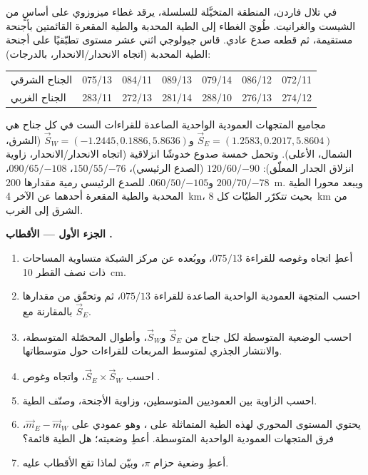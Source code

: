 \begin{problem}
\label{pb:b3:structural-analysis:1}
في تلال فاردن، المنطقة المتخيَّلة للسلسلة، يرقد غطاء ميزوزوي على
أساسٍ من الشيست والغرانيت. طُويَ الغطاء إلى الطية المحدبة والطية المقعرة
القائمتين بأجنحة مستقيمة، ثم قطعه صدع عادي. قاس جيولوجي
اثني عشر مستوى تطبّقيًا على أجنحة الطية المحدبة
(اتجاه الانحدار/الانحدار، بالدرجات):

\begin{center}
\small
\begin{tabular}{l|cccccc}
\hline
الجناح الشرقي & 075/13 & 084/11 & 089/13 & 079/14 & 086/12 & 072/11 \\
الجناح الغربي & 283/11 & 272/13 & 281/14 & 288/10 & 276/13 & 274/12 \\
\hline
\end{tabular}
\end{center}

مجاميع المتجهات العمودية الواحدية الصاعدة للقراءات الست في كل جناح هي
$\vec S_E = (1.2583, 0.2017, 5.8604)$ و$\vec S_W = (-1.2445, 0.1886,
5.8636)$ (الشرق، الشمال، الأعلى). وتحمل خمسة صدوع خدوشًا انزلاقية (اتجاه الانحدار/الانحدار،
زاوية انزلاق الجدار المعلّق): $120/60/{-90}$ (الصدع الرئيسي)، $150/55/{-76}$،
$090/65/{-108}$، $200/70/{-78}$ و$060/50/{-105}$. للصدع الرئيسي
رمية مقدارها \qty{200}{m}. ويبعد محورا الطية المحدبة والطية المقعرة أحدهما عن الآخر \qty{4}{km}،
بحيث تتكرّر الطيّات كل \qty{8}{km} من الشرق إلى الغرب.

\medskip\noindent\textbf{الجزء الأول --- الأقطاب .}
\begin{enumerate}
  \item أعطِ اتجاه  وغوصه للقراءة $075/13$،
        ووبُعده عن مركز الشبكة متساوية المساحات ذات نصف القطر
        \qty{10}{cm}.
  \item احسب المتجهة العمودية الواحدية الصاعدة للقراءة $075/13$، ثم
        وتحقّق من مقدارها بالمقارنة مع $\vec S_E$.
  \item احسب الوضعية المتوسطة لكل جناح من $\vec S_E$ و$\vec S_W$،
        وأطوال المحصّلة المتوسطة، والانتشار الجذري لمتوسط المربعات للقراءات
        حول متوسطاتها.
  \item احسب $\vec S_E\times\vec S_W$، واتجاه
        وغوص .
  \item احسب الزاوية بين العموديين المتوسطين، وزاوية الأجنحة،
        وصنّف الطية.
  \item يحتوي المستوى المحوري لهذه الطية المتماثلة على ، وهو
        عمودي على $\vec m_E - \vec m_W$، فرق المتجهات
        العمودية الواحدية المتوسطة. أعطِ وضعيته؛ هل الطية قائمة؟
  \item أعطِ وضعية حزام $\pi$، وبيّن لماذا تقع الأقطاب
        عليه.
\end{enumerate}


\end{problem}
